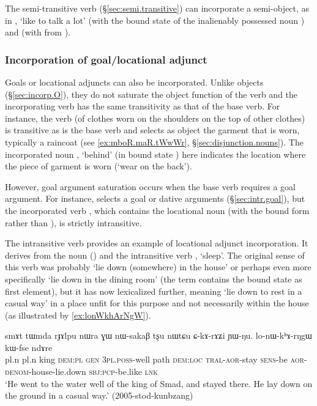 The semi-transitive verb  (§\ref{sec:semi.transitive}) can incorporate a semi-object, as in , `like to talk a lot' (with the bound state  of the inalienably possessed noun ) and  (with  from ).

 
\subsubsection{Incorporation of goal/locational adjunct} \label{sec:incorp.goal}
Goals or locational adjuncts can also be incorporated. Unlike objects (§\ref{sec:incorp.O}), they do not saturate the object function of the verb and the incorporating verb has the same transitivity as that of the base verb. For instance, the verb  (of clothes worn on the shoulders on the top of other clothes) is transitive as is the base verb  and selects as object the garment that is worn, typically a raincoat  (see \ref{ex:mboR.maR.tWwWr}, §\ref{sec:disjunction.nouns}). The incorporated noun , `behind' (in bound state ) here indicates the location where the piece of garment is worn (`wear on the back').

However, goal argument saturation occurs when the base verb requires a goal argument. For instance,  selects a goal or dative arguments (§\ref{sec:intr.goal}), but the incorporated verb , which contains the locational noun  (with the bound form  rather than ), is strictly intransitive.

The intransitive verb  provides an example of locational adjunct incorporation.  It derives from the noun   () and the intransitive verb , `sleep'. The original sense of this verb was probably `lie down (somewhere) in the house' or perhaps even more specifically  `lie down in the dining room' (the term  contains the bound state  as first element), but it has now lexicalized further, meaning `lie down to rest in a casual way' in a place unfit for this purpose and not necessarily within the house (as illustrated by \ref{ex:lonWkhArNgW}).

\begin{exe}
\ex \label{ex:lonWkhArNgW}
\gll  smɤt tɯmda rɟɤlpu nɯra ɣɯ nɯ-sakaβ tʂu nɯtɕu ɕ-kɤ-rɤʑi ɲɯ-ŋu.  lo-nɯ-kʰɤ-rŋgɯ kɯ-fse ndɤre \\
pl.n pl.n king \textsc{dem}:\textsc{pl} \textsc{gen} \textsc{3pl}.\textsc{poss}-well path \textsc{dem}:\textsc{loc} \textsc{tral}-\textsc{aor}-stay \textsc{sens}-be \textsc{aor}-\textsc{denom}-house-lie.down \textsc{sbj}:\textsc{pcp}-be.like \textsc{lnk} \\
\glt `He went to the water well of the king of Smad, and stayed there. He lay down on the ground in a casual way.' (2005-stod-kunbzang)
\end{exe}

